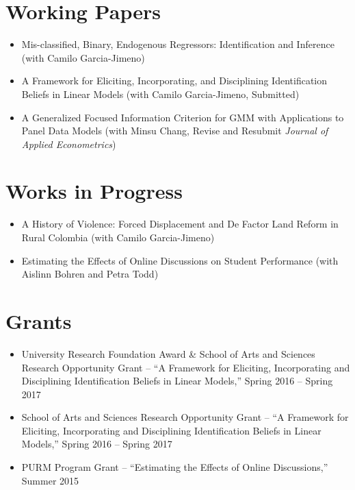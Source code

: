 \documentclass[line,overlapped]{myres}
\begin{document}
\begin{resume}
\section{\sc Working Papers}
\begin{itemize}
  \item Mis-classified, Binary, Endogenous Regressors: Identification and Inference (with Camilo Garcia-Jimeno)
	\item A Framework for Eliciting, Incorporating, and Disciplining Identification Beliefs in Linear Models (with Camilo Garcia-Jimeno, Submitted)
  \item A Generalized Focused Information Criterion for GMM with Applications to Panel Data Models (with Minsu Chang, Revise and Resubmit \emph{Journal of Applied Econometrics})
\end{itemize}


\section{\sc Works in Progress}
\begin{itemize}
  \item A History of Violence: Forced Displacement and De Factor Land Reform in Rural Colombia (with Camilo Garcia-Jimeno)
  \item Estimating the Effects of Online Discussions on Student Performance (with Aislinn Bohren and Petra Todd)
\end{itemize}

\section{\sc Grants}
\begin{itemize}
  \item University Research Foundation Award \& School of Arts and Sciences Research Opportunity Grant  -- ``A Framework for Eliciting, Incorporating and Disciplining Identification Beliefs in Linear Models,'' Spring 2016 -- Spring 2017
  \item School of Arts and Sciences Research Opportunity Grant -- ``A Framework for Eliciting, Incorporating and Disciplining Identification Beliefs in Linear Models,'' Spring 2016 -- Spring 2017   
  \item PURM Program Grant -- ``Estimating the Effects of Online Discussions,'' Summer 2015
\end{itemize}





\end{resume}
\end{document}
